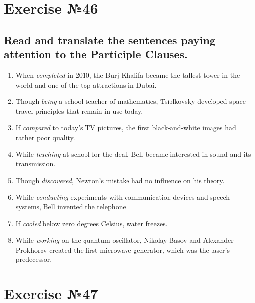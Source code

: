 \section{Exercise №46}

\subsection*{Read and translate the sentences paying attention to the Participle Clauses.}
\begin{enumerate}
      \item When \textit{completed} in 2010, the Burj Khalifa became the tallest tower in the world and one of the top attractions in Dubai.
      \item Though \textit{being} a school teacher of mathematics, Tsiolkovsky developed space travel principles that remain in use today.
      \item If \textit{compared} to today's TV pictures, the first black-and-white images had rather poor quality.
      \item While \textit{teaching} at school for the deaf, Bell became interested in sound and its transmission.
      \item Though \textit{discovered}, Newton's mistake had no influence on his theory.
      \item While \textit{conducting} experiments with communication devices and speech systems, Bell invented the telephone.
      \item If \textit{cooled} below zero degrees Celsius, water freezes.
      \item While \textit{working} on the quantum oscillator, Nikolay Basov and Alexander Prokhorov created the first microwave generator, which was the laser’s predecessor.
\end{enumerate}

\section{Exercise №47}
